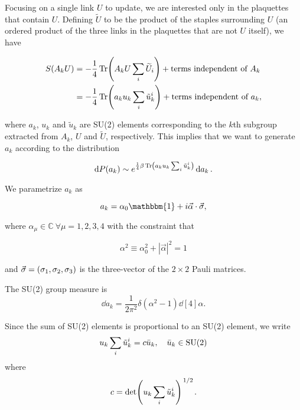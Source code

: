\documentclass[reqno,12pt]{article}
\numberwithin{equation}{section}
\newcommand{\SU}{\mathrm{SU}}
\newcommand{\id}{\mathbbm{1}}
\begin{document}
Focusing on a single link $U$ to update, we are interested only in the plaquettes that contain $U$. Defining
$\widetilde{U}$ to be the product of the staples surrounding $U$ (an ordered product of the three links in the plaquettes that
are not $U$ itself), we have 

\begin{align}
	S(A_k U) &= -\frac{1}{4} \Tr(A_k U \sum_i \widetilde{U}_i) + \text{terms independent of } A_k \\
	&= -\frac{1}{4} \Tr(a_k u_k \sum_i \tilde{u}_k^i) + \text{terms independent of } a_k, 
\end{align}

where $a_k$, $u_k$ and $\tilde{u}_k$ are SU(2) elements corresponding to the $k$th
subgroup extracted from $A_k$, $U$ and $\widetilde{U}$, respectively. This implies that we want to generate
$a_k$ according to the distribution

\begin{equation}
	\dd{P(a_k)} \sim e^{\frac{1}{4}\beta\Tr(a_k u_k \sum_i \tilde{u}_k^i)} \dd{a_k}.
\end{equation}

We parametrize $a_k$ as

\begin{equation}
	a_k = \alpha_0 \id + i \vec{\alpha} \cdot \vec{\sigma},
\end{equation}

where $\alpha_\mu \in \mathbb{C} \ \forall \mu = 1, 2, 3, 4$ with the constraint that 

\begin{equation}
	\alpha^2 \equiv \alpha_0^2 + |\vec{\alpha}|^2 = 1
\end{equation} 

and $\vec{\sigma} = \qty(\sigma_1, \sigma_2, \sigma_3)$ is the three-vector of the $2 \times 2$ Pauli matrices. 

The SU(2) group measure is 
\begin{equation}
	\dd{a_k} = \frac{1}{2\pi^2} \delta(\alpha^2 - 1) \dd[4]{\alpha}.
\end{equation}

Since the sum of SU(2) elements is proportional to an SU(2) element, we write
\begin{equation}
	u_k \sum_i \tilde{u}_k^i = c \bar{u}_k \qc \bar{u}_k \in \SU(2)
\end{equation}
where 
\begin{equation}
	c = \det(u_k \sum_i \tilde{u}_k^i)^{\flatfrac{1}{2}}.
\end{equation}
\end{document}
